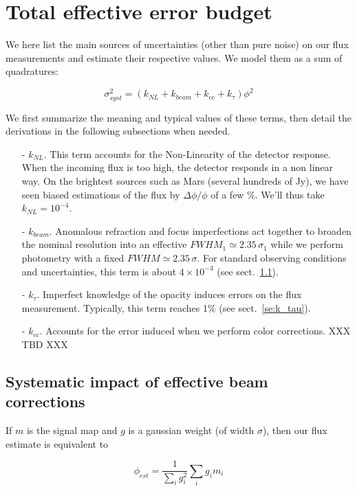 
\section{Total effective error budget}

We here list the main sources of uncertainties (other than pure noise) on our flux measurements and
estimate their respective values. We model them as a sum of quadratures:

\begin{equation}
\sigma_{syst}^2 = (k_{NL} + k_{beam} + k_{cc} + k_\tau)\phi^2
\end{equation}

We first summarize the meaning and typical values of these terms, then detail
the derivations in the following subsections when needed.

\begin{itemize}
\item[-] $k_{NL}$. This term accounts for the Non-Linearity of the detector response. When the incoming flux is too
  high, the detector responds in a non linear way. On the brightest sources
  such as Mars (several hundreds of Jy), we have seen biased estimations of the
  flux by $\Delta\phi/\phi$ of a few \%. We'll thus take $k_{NL}=10^{-4}$.
\item[-] $k_{beam}$. Anomalous refraction and focus imperfections act together to
  broaden the nominal resolution into an effective $FWHM_1 \simeq 2.35\,\sigma_1$ while we perform
  photometry with a fixed $FWHM \simeq 2.35\,\sigma$. For standard observing
  conditions and uncertainties, this term is about $4\times 10^{-3}$ (see sect.~\ref{se:k_beam}).
\item[-] $k_\tau$. Imperfect knowledge of the opacity induces errors on the flux
  measurement. Typically, this term reaches 1\% (see sect.~\ref{se:k_tau}).
\item[-] $k_{cc}$. Accounts for the error induced when we perform color
  corrections. XXX TBD XXX
\end{itemize}


\subsection{Systematic impact of effective beam corrections}
\label{se:k_beam}

 If $m$ is the signal map and $g$ is
  a gaussian weight (of width $\sigma$), then our flux estimate is equivalent to

\begin{equation}
\phi_{est} = \frac{1}{\sum_i g_i^2}\sum_i g_im_i
\end{equation}

